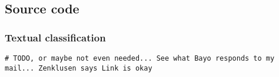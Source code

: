 \subsection{Source code}
\subsubsection{Textual classification}
\begin{verbatim}
# TODO, or maybe not even needed... See what Bayo responds to my mail... Zenklusen says Link is okay
\end{verbatim}